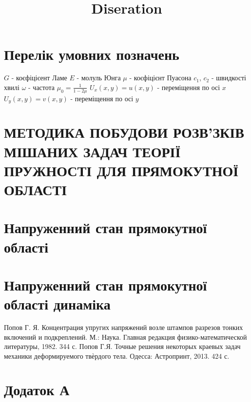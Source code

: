 \documentclass[a4paper,10pt]{extarticle}
\title{Diseration}
\author{}
\date{}
\numberwithin{equation}{section}
\begin{document}
\newpage

\renewcommand{\contentsname}{\centering Зміст}
\tableofcontents

\newpage

\section*{\centering Перелік умовних позначень}
$G$ - коєфіцієент Ламе \newline
$E$ - молуль Юнга \newline
$\mu$ - коєфіцієнт Пуасона \newline
$c_1$, $c_2$ - швидкості хвилі \newline
$\omega$ - частота \newline
$\mu_0 = \frac{1}{1 - 2\mu}$ \newline
$U_x(x,y) = u(x,y)$ - переміщення по осі $x$ \newline
$U_y(x,y) = v(x,y)$ - переміщення по осі $y$

\section{МЕТОДИКА ПОБУДОВИ РОЗВ’ЗКІВ МІШАНИХ ЗАДАЧ
ТЕОРІЇ ПРУЖНОСТІ ДЛЯ ПРЯМОКУТНОЇ ОБЛАСТІ}


\section{Напруженний стан прямокутної області}


\section{Напруженний стан прямокутної області динаміка}


\begin{thebibliography}{1}
    Попов Г. Я. Концентрация упругих напряжений возле штампов разрезов тонких включений и подкреплений. М.: Наука. Главная редакция физико-математической литературы, 1982. 344 с.
    Попов Г.Я. Точные решения некоторых краевых задач механики деформируемого твѐрдого тела. Одесса: Астропринт, 2013. 424 с.

\end{thebibliography}

\section[Додаток А ПОКРОКОВЕ ІНТЕГРУВАННЯ РІВНЯНЬ ЛАМЕ ЗА ЗМІННОЮ $x$]{\centering Додаток А}\label{ap_A}
\end{document}

